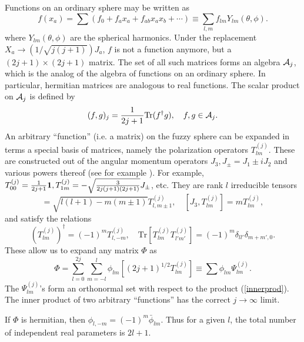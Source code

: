 \documentclass[a4paper,12pt]{article}
\numberwithin{equation}{section}
\begin{document}
Functions on an ordinary sphere may be written as
\begin{equation} 
f(x_a) = \sum(f_0 + f_a x_a + f_{ab}x_a x_b + \cdots) \equiv \sum_{l,m}
f_{lm} Y_{lm}(\theta, \phi).
\end{equation}
where $Y_{lm}(\theta, \phi)$ are the spherical harmonics. Under the
replacement $X_a \rightarrow (1/\sqrt{j(j+1)}) J_a$, $f$ is not a
function anymore, but a $(2j+1) \times (2j+1)$ matrix. The set of all
such matrices forms an algebra ${\cal A}_j$, which is the analog of
the algebra of functions on an ordinary sphere. In particular,
hermitian matrices are analogous to real functions. The scalar product
on ${\cal A}_j$ is defined by
\begin{equation} 
(f, g)_j = \frac{1}{2j+1} \text{Tr}(f^{\dagger} g), \quad f,g \in
{\cal A}_j.
\label{innerprod}
\end{equation} 
An arbitrary ``function'' (i.e. a matrix) on the fuzzy sphere can be
expanded in terms a special basis of matrices, namely the polarization
operators $T^{(j)}_{lm}$. These are constructed out of the angular
momentum operators $J_3, J_{\pm}=J_1 \pm i J_2$ and various powers
thereof (see for example \cite{vmkBook}). For example, $T^{(j)}_{00} =
\frac{1}{2j+1}{\bf 1}, T^{(j)}_{1m} =
-\sqrt{\frac{3}{2j(j+1)(2j+1)}} J_{\pm}$, etc. They are rank
$l$ irreducible tensors
\begin{equation}
[J_{\pm}, T^{(j)}_{lm}]= \sqrt{l(l+1)-m(m\pm 1)}T^{(j)}_{l,m \pm 1},
\quad [J_3, T^{(j)}_{lm}]= m T^{(j)}_{lm}, 
\end{equation} 
and satisfy the relations
\begin{equation} 
(T^{(j)}_{lm})^{\dagger} = (-1)^m T^{(j)}_{l,-m}, \quad \text{Tr}
[T^{(j)}_{lm} T^{(j)}_{l' m'}] = (-1)^m \delta_{l l'} \delta_{m+m', 0}. 
\end{equation} 
These allow us to expand any matrix $\Phi$ as
\begin{equation} 
\Phi = \sum^{2j}_{l=0}\sum^{l}_{m=-l} \phi_{lm} [(2j+1)^{1/2}T^{(j)}_{lm}]
\equiv \sum \phi_{lm} \Psi^{(j)}_{lm}.
\label{modeexp}
\end{equation}
The $\Psi^{(j)}_{lm}$'s form an orthonormal set with respect to the product
(\ref{innerprod}). The inner product of two arbitrary ``functions''
has the correct $j \rightarrow \infty$ limit.
 
If $\Phi$ is hermitian, then $\phi_{l, -m} = (-1)^{m}
\bar{\phi}_{lm}$. Thus for a given $l$, the total number of
independent real parameters is $2l+1$.
\end{document}
